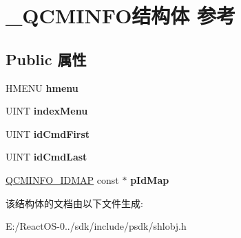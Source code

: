 \hypertarget{struct___q_c_m_i_n_f_o}{}\section{\+\_\+\+Q\+C\+M\+I\+N\+F\+O结构体 参考}
\label{struct___q_c_m_i_n_f_o}
\subsection*{Public 属性}
\begin{DoxyCompactItemize}
\item 
\mbox{\label{struct___q_c_m_i_n_f_o_a507f3218c952f038d1099977baf010c7}} 
H\+M\+E\+NU {\bfseries hmenu}
\item 
\mbox{\label{struct___q_c_m_i_n_f_o_adab852cb6758ac447c0bd31f3e6f1d78}} 
U\+I\+NT {\bfseries index\+Menu}
\item 
\mbox{\label{struct___q_c_m_i_n_f_o_ac5b6ab17f2ac05a6da806ba40e01dbe0}} 
U\+I\+NT {\bfseries id\+Cmd\+First}
\item 
\mbox{\label{struct___q_c_m_i_n_f_o_a7a7465cf3f22521da8e49d621345f37f}} 
U\+I\+NT {\bfseries id\+Cmd\+Last}
\item 
\mbox{\label{struct___q_c_m_i_n_f_o_a197da12b891f57133487b2eba7f91111}} 
\hyperlink{struct___q_c_m_i_n_f_o___i_d_m_a_p}{Q\+C\+M\+I\+N\+F\+O\+\_\+\+I\+D\+M\+AP} const  $\ast$ {\bfseries p\+Id\+Map}
\end{DoxyCompactItemize}


该结构体的文档由以下文件生成\+:\begin{DoxyCompactItemize}
\item 
E\+:/\+React\+O\+S-\/0../sdk/include/psdk/shlobj.\+h\end{DoxyCompactItemize}
